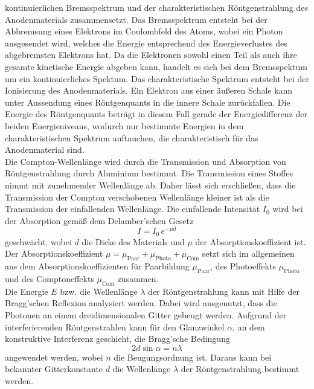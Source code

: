 kontinuierlichen Bremsspektrum und der charakteristischen Röntgenstrahlung des Anodenmaterials zusammensetzt. Das Bremsspektrum entsteht bei der Abbremsung eines Elektrons im Coulombfeld des Atoms, wobei ein 
Photon ausgesendet wird, welches die Energie entsprechend des Energieverlustes des abgebremsten Elektrons hat. Da die Elektronen sowohl einen Teil als auch ihre gesamte kinetische Energie abgeben kann, handelt es sich bei dem Bremsspektum um ein kontinuierliches Spektum.
Das charakteristische Spektrum entsteht bei der Ionisierung des Anodenmaterials. Ein Elektron aus einer äußeren Schale kann unter Aussendung eines Röntgenquants in die innere Schale zurückfallen. Die Energie des Röntgenquants beträgt in diesem Fall gerade der Energiedifferenz der beiden Energieniveaus, wodurch nur bestimmte Energien
in dem charakteristischen Spektrum auftauchen, die charakteristisch für das Anodenmaterial sind.
\\
Die Compton-Wellenlänge wird durch die Transmission und Absorption von Röntgenstrahlung durch Aluminium bestimmt. Die Transmission eines Stoffes nimmt mit zunehmender Wellenlänge ab.
Daher lässt sich erschließen, dass die Transmission der Compton verschobenen Wellenlänge kleiner ist als die Transmission der einfallenden Wellenlänge. Die
einfallende Intensität $I_0$ wird bei der Absorption gemäß dem Delamber'schen Gesetz
\begin{equation}
    I=I_0 \, e^{-\mu d}
    \label{eqn:delam}
\end{equation}
geschwächt, wobei $d$ die Dicke des Materials und $\mu$ der Absorptionskoeffizient ist. Der Absorptionskoeffizient $\mu=\mu_\text{Paar}+\mu_\text{Photo}+\mu_\text{Com}$ setzt sich im allgemeinen
aus dem Absorptionskoeffizienten für Paarbildung $\mu_\text{Paar}$, des Photoeffekts $\mu_\text{Photo}$ und des Comptoneffekts $\mu_\text{Com}$ zusammen.
\\
Die Energie $E$ bzw. die Wellenlänge $\lambda$ der Röntgenstrahlung kann mit Hilfe der Bragg'schen Reflexion analysiert werden. Dabei wird ausgenutzt, dass die Photonen an einem dreidimensionalen Gitter gebeugt werden.
Aufgrund der interferierenden Röntgenstrahlen kann für den Glanzwinkel $\alpha$, an dem konstruktive Interferenz geschieht, die Bragg'sche Bedingung
\begin{equation}
    2 d \sin \alpha = n \lambda
    \label{eqn:bragg}
\end{equation}
angewendet werden, wobei $n$ die Beugungsordnung ist. Daraus kann bei bekannter Gitterkonstante $d$ die Wellenlänge $\lambda$ der Röntgenstrahlung bestimmt werden. 